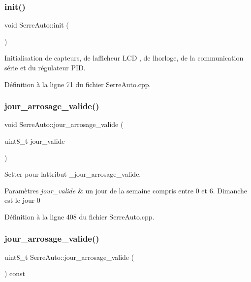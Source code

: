 \subsubsection{init()}
{\footnotesize\ttfamily void Serre\+Auto\+::init (\begin{DoxyParamCaption}{ }\end{DoxyParamCaption})}



Initialisation de capteurs, de l\textquotesingle{}afficheur L\+CD , de l\textquotesingle{}horloge, de la communication série et du régulateur P\+ID. 



Définition à la ligne 71 du fichier Serre\+Auto.\+cpp.

\mbox{\label{class_serre_auto_a3c6a23e18e41dc3fb071c42d703c63aa}} 
\subsubsection{jour\+\_\+arrosage\+\_\+valide()\hspace{0.1cm}{\footnotesize\ttfamily [1/2]}}
{\footnotesize\ttfamily void Serre\+Auto\+::jour\+\_\+arrosage\+\_\+valide (\begin{DoxyParamCaption}\item[{uint8\+\_\+t}]{jour\+\_\+valide }\end{DoxyParamCaption})}



Setter pour l\textquotesingle{}attribut \+\_\+jour\+\_\+arrosage\+\_\+valide. 


\begin{DoxyParams}{Paramètres}
{\em jour\+\_\+valide} & un jour de la semaine compris entre 0 et 6. Dimanche est le jour 0 \\
\hline
\end{DoxyParams}


Définition à la ligne 408 du fichier Serre\+Auto.\+cpp.

\mbox{\label{class_serre_auto_acc3186ced23d82472a40acd172d9af36}} 
\subsubsection{jour\+\_\+arrosage\+\_\+valide()\hspace{0.1cm}{\footnotesize\ttfamily [2/2]}}
{\footnotesize\ttfamily uint8\+\_\+t Serre\+Auto\+::jour\+\_\+arrosage\+\_\+valide (\begin{DoxyParamCaption}{ }\end{DoxyParamCaption}) const}



